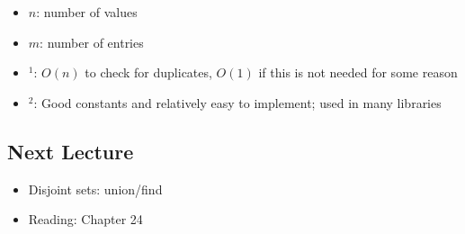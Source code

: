 \documentclass[
  10pt,
  english,
  letterpaper,
,tablecaptionabove
]{scrartcl}
\providecommand{\tightlist}{%
  \setlength{\itemsep}{0pt}\setlength{\parskip}{0pt}}
\begin{document}
\begin{itemize}
\tightlist
\item
  \(n\): number of values
\item
  \(m\): number of entries
\item
  \(^1\): \(O(n)\) to check for duplicates, \(O(1)\) if this is not
  needed for some reason
\item
  \(^2\): Good constants and relatively easy to implement; used in many
  libraries
\end{itemize}

\hypertarget{next-lecture}{%
\subsection{Next Lecture}\label{next-lecture}}

\begin{itemize}
\tightlist
\item
  Disjoint sets: union/find
\item
  Reading: Chapter 24
\end{itemize}
\end{document}
